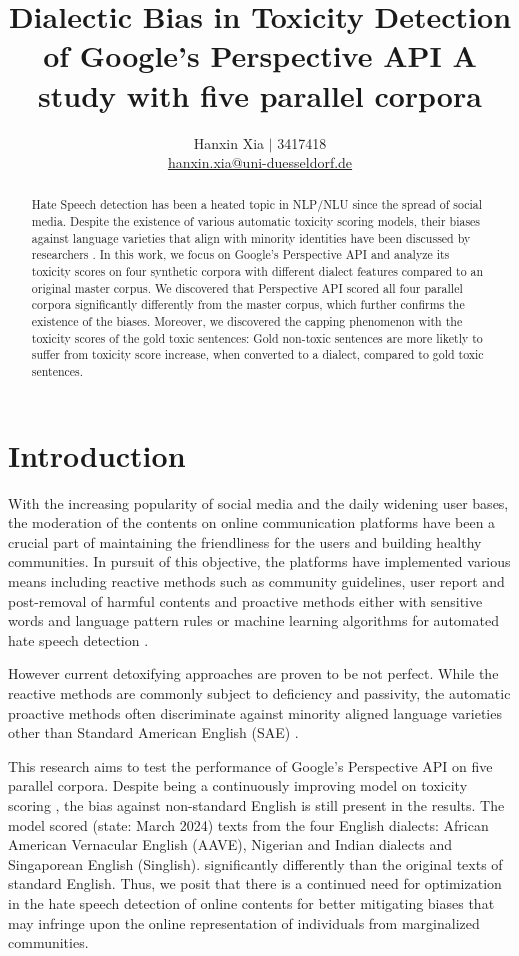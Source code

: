 \documentclass[11pt]{article}
\title{Dialectic Bias in Toxicity Detection of Google's Perspective API
\bigbreak A study with five parallel corpora}
\author{Hanxin Xia $\vert$ 3417418\\
  \href{mailto://hanxin.xia@uni-duesseldorf.de}{hanxin.xia@uni-duesseldorf.de}}
\begin{document}
\maketitle

\begin{abstract}
Hate Speech detection has been a heated topic in NLP/NLU since the spread of social media. Despite the existence of various automatic toxicity scoring models, their biases against language varieties that align with minority identities have been discussed by researchers \citep{sap-etal-2019-risk}. In this work, we focus on Google's Perspective API and analyze its toxicity scores on four synthetic corpora with different dialect features compared to an original master corpus. We discovered that Perspective API scored all four parallel corpora significantly differently from the master corpus, which further confirms the existence of the biases. Moreover, we discovered the capping phenomenon with the toxicity scores of the gold toxic sentences: Gold non-toxic sentences are more liketly to suffer from toxicity score increase, when converted to a dialect, compared to gold toxic sentences.
\end{abstract}


\section{Introduction}

With the increasing popularity of social media and the daily widening user bases, the moderation of the contents on online communication platforms have been a crucial part of maintaining the friendliness for the users and building healthy communities. In pursuit of this objective, the platforms have implemented various means including reactive methods such as community guidelines, user report and post-removal of harmful contents and proactive methods either with sensitive words and language pattern rules \citep{gitari-2015-lexicon} or machine learning algorithms for automated hate speech detection \citep{alrehili-2019-survey}.

However current detoxifying approaches are proven to be not perfect. While the reactive methods are commonly subject to deficiency and passivity, the automatic proactive methods often discriminate against minority aligned language varieties other than Standard American English (SAE) \citep{sap-etal-2019-risk, zhou-etal-2021-challenges}.

This research aims to test the performance of Google’s Perspective API on five parallel corpora. Despite being a continuously improving model on toxicity scoring \citep{google-perspective}, the bias against non-standard English is still present in the results. The model scored (state: March 2024) texts from the four English dialects: African American Vernacular English (AAVE), Nigerian and Indian dialects and Singaporean English (Singlish). significantly differently than the original texts of standard English. Thus, we posit that there is a continued need for optimization in the hate speech detection of online contents for better mitigating biases that may infringe upon the online representation of individuals from marginalized communities.
\end{document}
